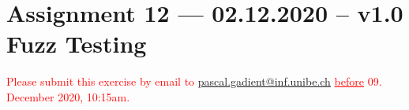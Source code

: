 \documentclass [11pt, a4wide, twoside]{article}
\newcommand{\cmark}{\ding{51}}%
\newcommand{\xmark}{\ding{55}}%
\newcommand{\done}{\rlap{$\square$}{\raisebox{2pt}{\large\hspace{1pt}\cmark}}%
\hspace{-2.5pt}}
\newcommand{\wontfix}{\rlap{$\square$}{\large\hspace{1pt}\xmark}}
\begin{document}
\section*{Assignment 12 --- 02.12.2020 -- v1.0\\Fuzz Testing}

\textcolor{red}{Please submit this exercise by email to \href{mailto:pascal.gadient@inf.unibe.ch}{pascal.gadient@inf.unibe.ch} \underline{before} 09. December 2020, 10:15am.}


\end{document}
